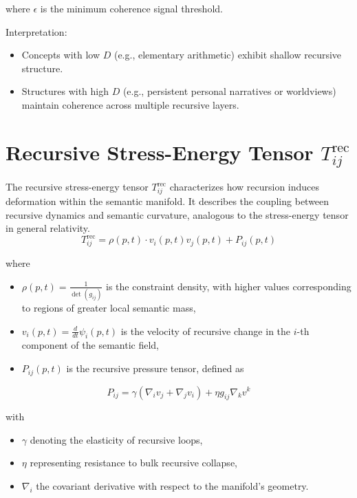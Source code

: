 where \(\epsilon\) is the minimum coherence signal threshold.

Interpretation:
\begin{itemize}
    \item Concepts with low \(D\) (e.g., elementary arithmetic) exhibit shallow recursive structure.
    \item Structures with high \(D\) (e.g., persistent personal narratives or worldviews) maintain coherence across multiple recursive layers.
\end{itemize}

\section{\texorpdfstring{Recursive Stress-Energy Tensor $T_{ij}^{\text{rec}}$}{Recursive Stress-Energy Tensor Tij\_rec}}

The recursive stress-energy tensor \(T_{ij}^{\text{rec}}\) characterizes how recursion induces deformation within the semantic manifold. It describes the coupling between recursive dynamics and semantic curvature, analogous to the stress-energy tensor in general relativity.
\begin{equation}
T_{ij}^{\text{rec}} = \rho(p,t) \cdot v_i(p,t) v_j(p,t) + P_{ij}(p,t)
\end{equation}

where
\begin{itemize}
    \item \(\rho(p,t) = \frac{1}{\det(g_{ij})}\) is the constraint density, with higher values corresponding to regions of greater local semantic mass,
    \item \(v_i(p,t) = \frac{d}{dt} \psi_i(p,t)\) is the velocity of recursive change in the \(i\)-th component of the semantic field,
    \item \(P_{ij}(p,t)\) is the recursive pressure tensor, defined as
\end{itemize}
\begin{equation}
P_{ij} = \gamma(\nabla_i v_j + \nabla_j v_i) + \eta g_{ij} \nabla_k v^k
\end{equation}

with
\begin{itemize}
    \item \(\gamma\) denoting the elasticity of recursive loops,
    \item \(\eta\) representing resistance to bulk recursive collapse,
    \item \(\nabla_i\) the covariant derivative with respect to the manifold's geometry.
\end{itemize}

